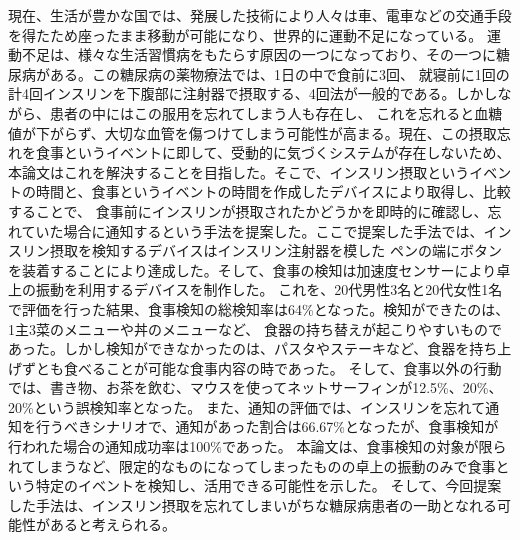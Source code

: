 \begin{jabstract}

現在、生活が豊かな国では、発展した技術により人々は車、電車などの交通手段を得たため座ったまま移動が可能になり、世界的に運動不足になっている。
運動不足は、様々な生活習慣病をもたらす原因の一つになっており、その一つに糖尿病がある。この糖尿病の薬物療法では、1日の中で食前に3回、
就寝前に1回の計4回インスリンを下腹部に注射器で摂取する、4回法が一般的である。しかしながら、患者の中にはこの服用を忘れてしまう人も存在し、
これを忘れると血糖値が下がらず、大切な血管を傷つけてしまう可能性が高まる。現在、この摂取忘れを食事というイベントに即して、受動的に気づくシステムが存在しないため、
本論文はこれを解決することを目指した。そこで、インスリン摂取というイベントの時間と、食事というイベントの時間を作成したデバイスにより取得し、比較することで、
食事前にインスリンが摂取されたかどうかを即時的に確認し、忘れていた場合に通知するという手法を提案した。ここで提案した手法では、インスリン摂取を検知するデバイスはインスリン注射器を模した
ペンの端にボタンを装着することにより達成した。そして、食事の検知は加速度センサーにより卓上の振動を利用するデバイスを制作した。
これを、20代男性3名と20代女性1名で評価を行った結果、食事検知の総検知率は64\%となった。検知ができたのは、1主3菜のメニューや丼のメニューなど、
食器の持ち替えが起こりやすいものであった。しかし検知ができなかったのは、パスタやステーキなど、食器を持ち上げずとも食べることが可能な食事内容の時であった。
そして、食事以外の行動では、書き物、お茶を飲む、マウスを使ってネットサーフィンが12.5\%、20\%、20\%という誤検知率となった。
また、通知の評価では、インスリンを忘れて通知を行うべきシナリオで、通知があった割合は66.67\%となったが、食事検知が行われた場合の通知成功率は100\%であった。
本論文は、食事検知の対象が限られてしまうなど、限定的なものになってしまったものの卓上の振動のみで食事という特定のイベントを検知し、活用できる可能性を示した。
そして、今回提案した手法は、インスリン摂取を忘れてしまいがちな糖尿病患者の一助となれる可能性があると考えられる。

\end{jabstract}
